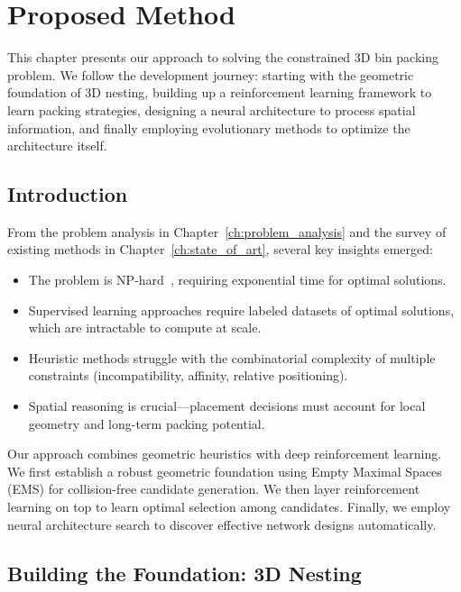 \chapter{Proposed Method}
\label{ch:proposed_method}

This chapter presents our approach to solving the constrained 3D bin packing problem. We follow the development journey: starting with the geometric foundation of 3D nesting, building up a reinforcement learning framework to learn packing strategies, designing a neural architecture to process spatial information, and finally employing evolutionary methods to optimize the architecture itself.

\section{Introduction}

From the problem analysis in Chapter~\ref{ch:problem_analysis} and the survey of existing methods in Chapter~\ref{ch:state_of_art}, several key insights emerged:

\begin{itemize}
    \item The problem is NP-hard~\cite{garey1979computers}, requiring exponential time for optimal solutions.
    \item Supervised learning approaches require labeled datasets of optimal solutions, which are intractable to compute at scale.
    \item Heuristic methods struggle with the combinatorial complexity of multiple constraints (incompatibility, affinity, relative positioning).
    \item Spatial reasoning is crucial---placement decisions must account for local geometry and long-term packing potential.
\end{itemize}

Our approach combines geometric heuristics with deep reinforcement learning. We first establish a robust geometric foundation using Empty Maximal Spaces (EMS) for collision-free candidate generation. We then layer reinforcement learning on top to learn optimal selection among candidates. Finally, we employ neural architecture search to discover effective network designs automatically.

\section{Building the Foundation: 3D Nesting}

